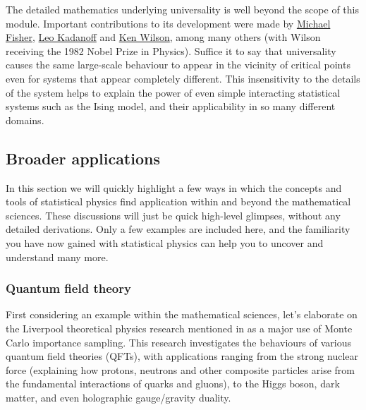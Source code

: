 The detailed mathematics underlying universality is well beyond the scope of this module.
Important contributions to its development were made by \href{https://en.wikipedia.org/wiki/Michael_Fisher}{Michael Fisher}, \href{https://en.wikipedia.org/wiki/Leo_Kadanoff}{Leo Kadanoff} and \href{https://en.wikipedia.org/wiki/Kenneth_G._Wilson}{Ken Wilson}, among many others (with Wilson receiving the 1982 Nobel Prize in Physics).
Suffice it to say that universality causes the same large-scale behaviour to appear in the vicinity of critical points even for systems that appear completely different.
This insensitivity to the details of the system helps to explain the power of even simple interacting statistical systems such as the Ising model, and their applicability in so many different domains. %



\subsection{\label{sec:broad}Broader applications}
In this section we will quickly highlight a few ways in which the concepts and tools of statistical physics find application within and beyond the mathematical sciences.
These discussions will just be quick high-level glimpses, without any detailed derivations.
Only a few examples are included here, and the familiarity you have now gained with statistical physics can help you to uncover and understand many more.

\subsubsection*{Quantum field theory}
First considering an example within the mathematical sciences, let's elaborate on the Liverpool theoretical physics research mentioned in  as a major use of Monte Carlo importance sampling.
This research investigates the behaviours of various quantum field theories (QFTs), with applications ranging from the strong nuclear force (explaining how protons, neutrons and other composite particles arise from the fundamental interactions of quarks and gluons), to the Higgs boson, dark matter, and even holographic gauge/gravity duality.

